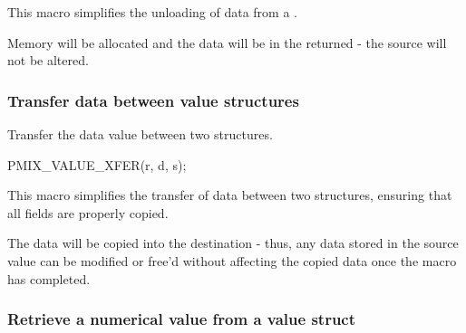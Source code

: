 \begin{arglist}
\end{arglist}

\descr

This macro simplifies the unloading of data from a .

\adviceuserstart
Memory will be allocated and the data will be in the  returned - the source  will not be altered.
\adviceuserend


\subsubsection{Transfer data between value structures}

\summary

Transfer the data value between two  structures.

\cspecificstart
\begin{codepar}
PMIX_VALUE_XFER(r, d, s);
\end{codepar}
\cspecificend

\begin{arglist}
\end{arglist}

\descr

This macro simplifies the transfer of data between two  structures, ensuring that all fields are properly copied.

\adviceuserstart
The data will be copied into the destination  - thus, any data stored in the source value can be modified or free'd without affecting the copied data once the macro has completed.
\adviceuserend


\subsubsection{Retrieve a numerical value from a value struct}

